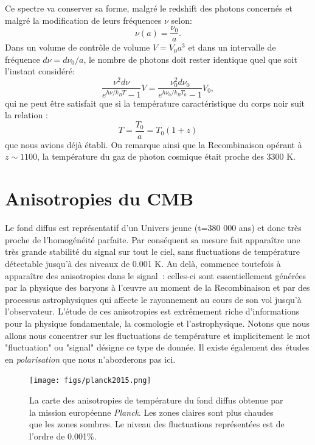 Ce spectre va conserver sa forme, malgré le redshift des photons concernés et malgré la modification de leurs fréquences $\nu$ selon:
\begin{equation}
\nu(a)=\frac{\nu_0}{a}.
\end{equation}
Dans un volume de contrôle de volume $V=V_0a^3$ et dans un intervalle de fréquence $d\nu=d\nu_0/a$, le nombre de photons doit rester identique quel que soit l'instant considéré:
\begin{equation}
\frac{\nu^2d\nu}{e^{h\nu/k_BT}-1}V=\frac{\nu_0^2d\nu_0}{e^{h\nu_0/k_BT_0}-1}V_0,
\end{equation}
qui ne peut être satisfait que si la température caractéristique du corps noir suit la relation :
\begin{equation}
T=\frac{T_0}{a}=T_0(1+z)
\end{equation}
que nous avions déjà établi. On remarque ainsi que la Recombinaison opérant à $z\sim1100$, la température du gaz de photon cosmique était proche des 3300 K.

\section{Anisotropies du CMB}
Le fond diffus est représentatif d'un Univers jeune (t=380 000 ans) et donc très proche de l'homogénéité parfaite. Par conséquent sa mesure fait apparaître une très grande stabilité du signal sur tout le ciel, sans fluctuations de température détectable jusqu'à des niveaux de 0.001 K. Au delà, commence toutefois à apparaître des anisotropies dans le signal~: celles-ci sont essentiellement générées par la physique des baryons à l'œuvre au moment de la Recombinaison et par des processus astrophysiques qui affecte le rayonnement au cours de son vol jusqu'à l'observateur. L'étude de ces anisotropies est extrêmement riche d'informations pour la physique fondamentale, la cosmologie et l'astrophysique. Notons que nous allons nous concentrer sur les fluctuations de température et implicitement le mot "fluctuation" ou "signal" désigne ce type de donnée. Il existe également des études en \textit{polarisation} que nous n'aborderons pas ici.

\begin{figure}[htbp]
	\centering
		\texttt{[image: figs/planck2015.png]}
		\caption[Les fluctuations de température vues par Planck]{La carte des anisotropies de température du fond diffus obtenue par la mission européenne \textit{Planck}. Les zones claires sont plus chaudes que les zones sombres. Le niveau des fluctuations représentées est de l'ordre de 0.001\%.}
	\label{f:planckmap}
\end{figure}

